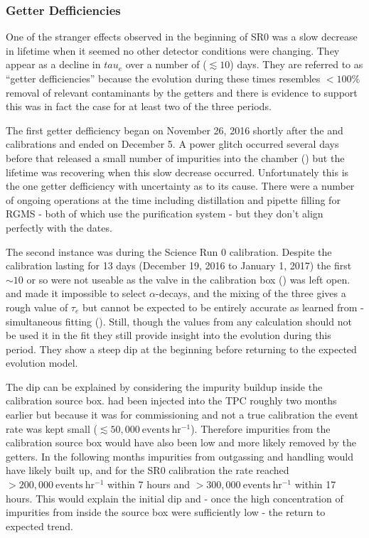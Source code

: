 {\subsubsection{Getter Defficiencies}
\label{subsubsec:electron_lifetime_model_detector_effects_getter}
One of the stranger effects observed in the beginning of SR0 was a slow decrease in lifetime when it seemed no other detector conditions
were changing.  They
appear as a decline in $tau_e$ over a number of ($\lesssim 10$) days.  They are referred to as ``getter defficiencies'' because the
evolution during these times resembles $< 100\%$ removal of relevant
contaminants by the getters and there is evidence to support this was in fact the case for at least two of the three periods.

The first getter defficiency
began on November 26, 2016 shortly after the \ambe and \metakr calibrations and ended on December 5.  A power glitch occurred several
days before that released a small number of impurities into the chamber
() but the lifetime was recovering when this slow decrease
occurred.  Unfortunately this is the one getter defficiency with uncertainty as to its cause.  There were a number of ongoing operations
at the time including  distillation and pipette filling for RGMS - both of which use the purification system - but they don't
align perfectly with the dates.

The second instance was during the Science Run 0 \rncal calibration.  Despite the calibration lasting for 13 days (December 19, 2016 to
January 1, 2017) the first ${\sim} 10$ or
so were not useable as the valve in the calibration box () was left
open.  \rncal and  made it impossible to select  $\alpha$-decays, and the mixing of the three gives a rough
value of $\tau_e$ but cannot be expected to be entirely accurate as learned from \rnbkg- simultaneous fitting
().  Still, though the values from any calculation should not be used it in the
fit they still provide insight into the evolution during this period.  They show a steep dip at the beginning before returning to the
expected evolution model.

The dip can be explained by considering the impurity buildup inside the calibration source box.  \rncal had been injected into the TPC
roughly two months earlier but because it was for commissioning and not a true calibration the event rate was kept small
($\lesssim 50,000\ \mathrm{events\ hr^{-1}}$).  Therefore
impurities from the calibration source box would have also been low and more likely removed by the getters.  In the following months
impurities from outgassing and handling would have likely built up, and for the SR0 calibration the rate reached
$> 200,000\ \mathrm{events\ hr^{-1}}$ within 7 hours and $> 300,000\ \mathrm{events\ hr^{-1}}$ within 17 hours.  This would explain the
initial dip and - once the high concentration of impurities from inside the source box were sufficiently low - the return to expected
trend.

}
